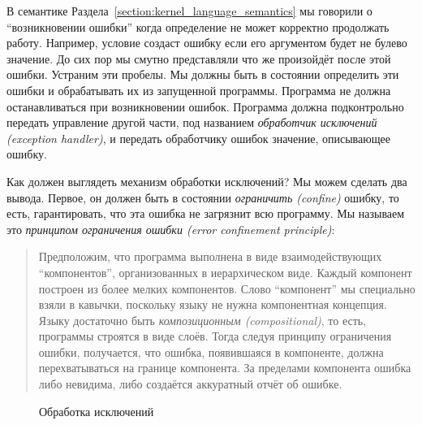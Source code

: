В семантике Раздела~\ref{section:kernel_language_semantics} мы говорили о ``возникновении ошибки'' когда определение не может корректно продолжать работу. Например, условие создаст ошибку если его аргументом будет не булево значение. До сих пор мы смутно представляли что же произойдёт после этой ошибки. Устраним эти пробелы. Мы должны быть в состоянии определить эти ошибки и обрабатывать их из запущенной программы. Программа не должна останавливаться при возникновении ошибок. Программа должна подконтрольно передать управление другой части, под названием \emph{обработчик исключений (exception handler)}, и передать обработчику ошибок значение, описывающее ошибку.

Как должен выглядеть механизм обработки исключений? Мы можем сделать два вывода. Первое, он должен быть в состоянии \emph{ограничить (confine)} ошибку, то есть, гарантировать, что эта ошибка не загрязнит всю программу. Мы называем это \emph{принципом ограничения ошибки (error confinement principle)}:

\begin{quote}
Предположим, что программа выполнена в виде взаимодействующих ``компонентов'', организованных в иерархическом виде. Каждый компонент построен из более мелких компонентов. Слово ``компонент'' мы специально взяли в кавычки, поскольку языку не нужна компонентная концепция. Языку достаточно быть \emph{композиционным (compositional)}, то есть, программы строятся в виде слоёв. Тогда следуя принципу ограничения ошибки, получается, что ошибка, появившаяся в компоненте, должна перехватываться на границе компонента. За пределами компонента ошибка либо невидима, либо создаётся аккуратный отчёт об ошибке.
\end{quote}

\begin{figure}
\caption{Обработка исключений}
\label{figure:exception_handling}
\end{figure}

